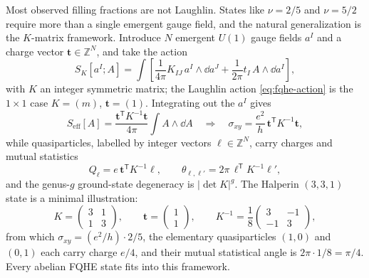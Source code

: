 Most observed filling fractions are not Laughlin. States like $\nu=2/5$ and $\nu=5/2$ require more than a single emergent gauge field, and the natural generalization is the $K$-matrix framework. Introduce $N$ emergent $U(1)$ gauge fields $a^I$ and a charge vector $\mathbf{t}\in\mathbb{Z}^N$, and take the action
\begin{equation}
  S_{K}[a^I;A]
  =
  \int\left[
  \frac{1}{4\pi}K_{IJ}\,a^I\wedge\dd a^J
  +
  \frac{1}{2\pi}t_I\,A\wedge\dd a^I
  \right],
  \label{eq:fqhe-k-matrix-action}
\end{equation}
with $K$ an integer symmetric matrix; the Laughlin action \eqref{eq:fqhe-action} is the $1\times 1$ case $K=(m)$, $\mathbf{t}=(1)$. Integrating out the $a^I$ gives
\begin{equation}
  S_{\mathrm{eff}}[A]
  =
  \frac{\mathbf{t}^{\mathsf{T}}K^{-1}\mathbf{t}}{4\pi}\int A\wedge\dd A
  \quad\Longrightarrow\quad
  \sigma_{xy} = \frac{e^2}{h}\,\mathbf{t}^{\mathsf{T}}K^{-1}\mathbf{t},
  \label{eq:fqhe-k-hall}
\end{equation}
while quasiparticles, labelled by integer vectors $\boldsymbol{\ell}\in\mathbb{Z}^N$, carry charges and mutual statistics
\begin{equation}
  Q_{\boldsymbol{\ell}} = e\,\mathbf{t}^{\mathsf{T}}K^{-1}\boldsymbol{\ell},
  \qquad
  \theta_{\boldsymbol{\ell},\boldsymbol{\ell}'} = 2\pi\,\boldsymbol{\ell}^{\mathsf{T}}K^{-1}\boldsymbol{\ell}',
\end{equation}
and the genus-$g$ ground-state degeneracy is $|\det K|^{g}$. The Halperin $(3,3,1)$ state is a minimal illustration:
\begin{equation}
  K = \begin{pmatrix} 3 & 1 \\ 1 & 3\end{pmatrix},
  \qquad
  \mathbf{t} = \begin{pmatrix}1\\1\end{pmatrix},
  \qquad
  K^{-1} = \frac{1}{8}\begin{pmatrix} 3 & -1 \\ -1 & 3\end{pmatrix},
\end{equation}
from which $\sigma_{xy} = (e^{2}/h)\cdot 2/5$, the elementary quasiparticles $(1,0)$ and $(0,1)$ each carry charge $e/4$, and their mutual statistical angle is $2\pi\cdot 1/8 = \pi/4$. Every abelian FQHE state fits into this framework.

